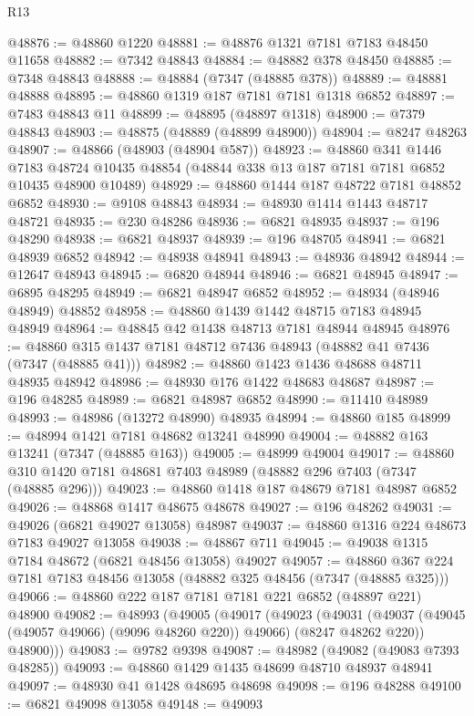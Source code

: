 \begin{lexlean}{R13}
\begin{coremodule}
@48876 := @48860 @1220
@48881 := @48876 @1321 @7181 @7183 @48450 @11658
@48882 := @7342 @48843
@48884 := @48882 @378 @48450
@48885 := @7348 @48843
@48888 := @48884 (@7347 (@48885 @378))
@48889 := @48881 @48888
@48895 := @48860 @1319 @187 @7181 @7181 @1318 @6852
@48897 := @7483 @48843 @11
@48899 := @48895 (@48897 @1318)
@48900 := @7379 @48843
@48903 := @48875 (@48889 (@48899 @48900))
@48904 := @8247 @48263
@48907 := @48866 (@48903 (@48904 @587))
@48923 := @48860
    @341
    @1446
    @7183
    @48724
    @10435
    @48854
    (@48844 @338 @13 @187 @7181 @7181 @6852 @10435 @48900 @10489)
@48929 := @48860 @1444 @187 @48722 @7181 @48852 @6852
@48930 := @9108 @48843
@48934 := @48930 @1414 @1443 @48717 @48721
@48935 := @230 @48286
@48936 := @6821 @48935
@48937 := @196 @48290
@48938 := @6821 @48937
@48939 := @196 @48705
@48941 := @6821 @48939 @6852
@48942 := @48938 @48941
@48943 := @48936 @48942
@48944 := @12647 @48943
@48945 := @6820 @48944
@48946 := @6821 @48945
@48947 := @6895 @48295
@48949 := @6821 @48947 @6852
@48952 := @48934 (@48946 @48949) @48852
@48958 := @48860 @1439 @1442 @48715 @7183 @48945 @48949
@48964 := @48845 @42 @1438 @48713 @7181 @48944 @48945
@48976 := @48860 @315 @1437 @7181 @48712 @7436 @48943 (@48882 @41 @7436 (@7347 (@48885 @41)))
@48982 := @48860 @1423 @1436 @48688 @48711 @48935 @48942
@48986 := @48930 @176 @1422 @48683 @48687
@48987 := @196 @48285
@48989 := @6821 @48987 @6852
@48990 := @11410 @48989
@48993 := @48986 (@13272 @48990) @48935
@48994 := @48860 @185
@48999 := @48994 @1421 @7181 @48682 @13241 @48990
@49004 := @48882 @163 @13241 (@7347 (@48885 @163))
@49005 := @48999 @49004
@49017 := @48860 @310 @1420 @7181 @48681 @7403 @48989 (@48882 @296 @7403 (@7347 (@48885 @296)))
@49023 := @48860 @1418 @187 @48679 @7181 @48987 @6852
@49026 := @48868 @1417 @48675 @48678
@49027 := @196 @48262
@49031 := @49026 (@6821 @49027 @13058) @48987
@49037 := @48860 @1316 @224 @48673 @7183 @49027 @13058
@49038 := @48867 @711
@49045 := @49038 @1315 @7184 @48672 (@6821 @48456 @13058) @49027
@49057 := @48860 @367 @224 @7181 @7183 @48456 @13058 (@48882 @325 @48456 (@7347 (@48885 @325)))
@49066 := @48860 @222 @187 @7181 @7181 @221 @6852 (@48897 @221) @48900
@49082 := @48993
    (@49005
      (@49017
        (@49023
          (@49031 (@49037 (@49045 (@49057 @49066) (@9096 @48260 @220)) @49066) (@8247 @48262 @220))
          @48900)))
@49083 := @9782 @9398
@49087 := @48982 (@49082 (@49083 @7393 @48285))
@49093 := @48860 @1429 @1435 @48699 @48710 @48937 @48941
@49097 := @48930 @41 @1428 @48695 @48698
@49098 := @196 @48288
@49100 := @6821 @49098 @13058
@49148 := @49093

\end{coremodule}
\end{lexlean}
